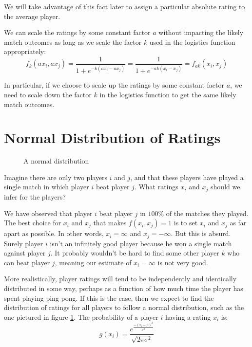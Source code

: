 \documentclass{article}
\begin{document}
We will take advantage of this fact later to assign a particular absolute
rating to the average player.

We can scale the ratings by some constant factor $a$ without impacting the
likely match outcomes as long as we scale the factor $k$ used in the
logistics function appropriately:
\begin{equation}
  f_k(a x_i, a x_j) =
  \frac{1}{1 + e^{-k(a x_i - a x_j)}} =
  \frac{1}{1 + e^{-ak(x_i - x_j)}} = f_{ak}(x_i, x_j)
\end{equation}

In particular, if we choose to scale up the ratings by some constant factor
$a$, we need to scale down the factor $k$ in the logistics function to get the
same likely match outcomes.

\section{Normal Distribution of Ratings}
\begin{figure}
  \caption{A normal distribution}
  \label{fig:normal}
 \end{figure}
Imagine there are only two players $i$ and $j$, and that these players have
played a single match in which player $i$ beat player $j$. What ratings $x_i$
and $x_j$ should we infer for the players?

We have observed that player $i$ beat player $j$ in $100\%$ of the matches
they played. The best choice for $x_i$ and $x_j$ that makes $f(x_i, x_j) = 1$
is to set $x_i$ and $x_j$ as far apart as possible. In other words,
$x_i = \infty$ and $x_j = -\infty$. But this is absurd. Surely player $i$
isn't an infinitely good player because he won a single match against player
$j$. It probably wouldn't be hard to find some other player $k$ who can beat
player $j$, meaning our estimate of $x_i = \infty$ is not very good.

More realistically, player ratings will tend to be independently and
identically distributed in some way, perhaps as a function of how much time
the player has spent playing ping pong. If this is the case, then we expect to
find the distribution of ratings for all players to follow a normal
distribution, such as the one pictured in figure \ref{fig:normal}. The
probability of a player $i$ having a rating $x_i$ is:
\begin{equation}
  g(x_i) = \frac{e^{\frac{-(x_i - \mu)^2}{\sigma^2}}}{\sqrt{2\pi\sigma^2}}
\end{equation}
\end{document}
